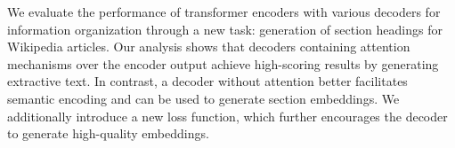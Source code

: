We evaluate the performance of transformer encoders with various decoders for information organization through a new task: generation of section headings for Wikipedia articles. Our analysis shows that decoders containing attention mechanisms over the encoder output achieve high-scoring results by generating extractive text. In contrast, a decoder without attention better facilitates semantic encoding and can be used to generate section embeddings. We additionally introduce a new loss function, which further encourages the decoder to generate high-quality embeddings.
